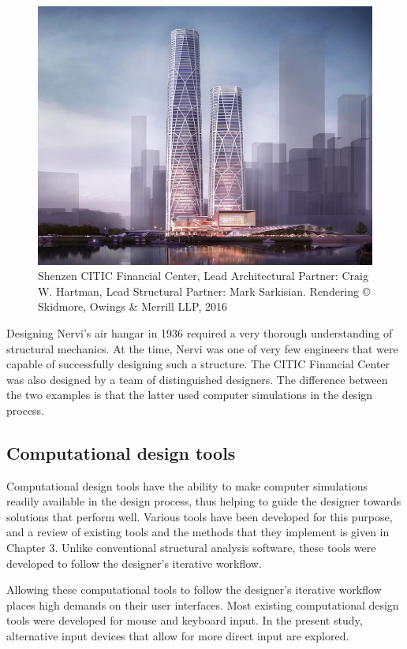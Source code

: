 \begin{figure}
  \includegraphics[width=350pt]{graphics/shenzen.jpg}
  \caption{Shenzen CITIC Financial Center, Lead Architectural Partner: Craig W. Hartman, Lead Structural Partner: Mark Sarkisian.  Rendering © Skidmore, Owings \& Merrill LLP, 2016}
  \label{fig:Shenzen}
\end{figure}

Designing Nervi’s air hangar in 1936 required a very thorough understanding of structural mechanics. At the time, Nervi was one of very few engineers that were capable of successfully designing such a structure. The CITIC Financial Center was also designed by a team of distinguished designers. The difference between the two examples is that the latter used computer simulations in the design process. 

\subsection{Computational design tools}
Computational design tools have the ability to make computer simulations readily available in the design process, thus helping to guide the designer towards solutions that perform well. Various tools have been developed for this purpose, and a review of existing tools and the methods that they implement is given in Chapter 3. Unlike conventional structural analysis software, these tools were developed to follow the designer’s iterative workflow. 

Allowing these computational tools to follow the designer’s iterative workflow places high demands on their user interfaces. Most existing computational design tools were developed for mouse and keyboard input. In the present study, alternative input devices that allow for more direct input are explored. 

